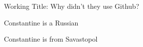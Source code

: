 Working Title: Why didn't they use Github?

Constantine is a Russian

Constantine is from Savastopol